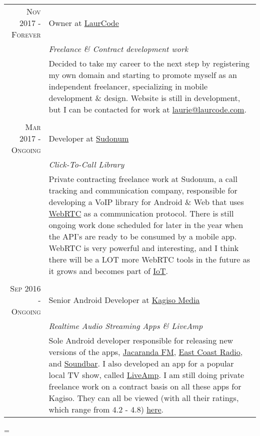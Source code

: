 \documentclass[a4paper,10pt,notitlepage]{article}
\newenvironment{absolutelynopagebreak}
  {\par\nobreak\vfil\penalty0\vfilneg
   \vtop\bgroup}
  {\par\xdef\tpd{\the\prevdepth}\egroup
   \prevdepth=\tpd}
\begin{document}
\begin{absolutelynopagebreak}
\begin{tabular}{r|p{11cm}}
		\textsc{Nov 2017 - Forever}  & Owner at \href{www.laurcode.com}{LaurCode}
		\\&\emph{Freelance \& Contract development work}\\&\footnotesize{Decided to take my career to the next step by registering my own domain and starting to promote myself as an independent freelancer, specializing in mobile development \& design. Website is still in development, but I can be contacted for work at \href{mailto:laurie@laurcode.com}{laurie@laurcode.com}.} \\
		
		\multicolumn{2}{c}{} \\
		
		\textsc{Mar 2017 - Ongoing}  & Developer at \href{www.sudonum.com}{Sudonum}
		\\&\emph{Click-To-Call Library}\\&\footnotesize{Private contracting freelance work at Sudonum, a call tracking and communication company, responsible for developing a VoIP library for Android \& Web that uses \href{https://en.wikipedia.org/wiki/WebRTC}{WebRTC} as a communication protocol. There is still ongoing work done scheduled for later in the year when the API's are ready to be consumed by a mobile app. WebRTC is very powerful and interesting, and I think there will be a LOT more WebRTC tools in the future as it grows and becomes part of
		\href{https://en.wikipedia.org/wiki/Internet_of_things}{IoT}.} \\
		
		\multicolumn{2}{c}{} \\
		\textsc{Sep 2016 - Ongoing}  & Senior Android Developer at \href{www.kagisomedia.co.za}{Kagiso Media}                                               \\&\emph{Realtime Audio Streaming Apps \& LiveAmp}\\&\footnotesize{Sole Android developer responsible for releasing new versions of the apps, \href{https://play.google.com/store/apps/details?id=com.kagiso.jacarandafm}{Jacaranda FM},  \href{https://play.google.com/store/apps/details?id=com.kagiso.ecr}{East Coast Radio}, and \href{https://play.google.com/store/apps/details?id=com.kagiso.soundbar}{Soundbar}. I also developed an app for a popular local TV show, called  \href{https://play.google.com/store/apps/details?id=com.kagiso.liveamp}{LiveAmp}. I am still doing private freelance work on a contract basis on all these apps for Kagiso. They can all be viewed (with all their ratings, which range from 4.2 - 4.8) \href{https://play.google.com/store/apps/developer?id=Kagiso+Media}{here}}. \\
		

\end{tabular}
\end{absolutelynopagebreak}
\end{document}
